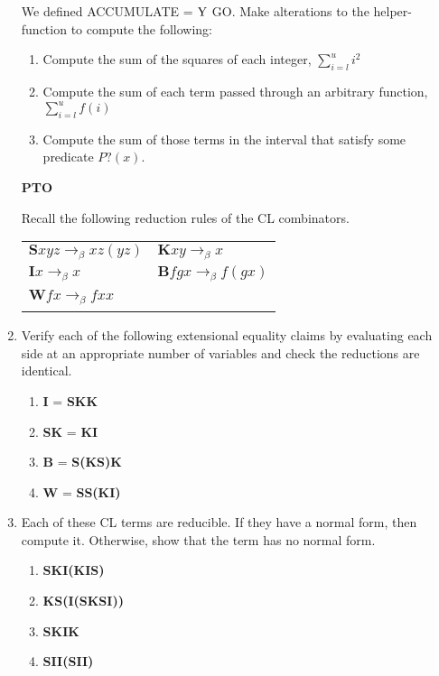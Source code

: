 \documentclass[11pt]{report}
\begin{document}
\begin{enumerate}
	 We defined ACCUMULATE = $\text{Y}$ GO. Make alterations to the helper-function to compute the following: 
	
	 \begin{enumerate}
	 	\item Compute the sum of the squares of each integer, $\sum_{i=l}^u i^{2}$
	 	\item Compute the sum of each term passed through an arbitrary function, $\sum_{i=l}^u f(i)$
	 	\item Compute the sum of those terms in the interval that satisfy some predicate $P?(x)$.
	 \end{enumerate}
	 
	 \vfill
	 \hfill \textbf{PTO}



\newpage

Recall the following reduction rules of the CL combinators. 

\begin{tabular}{l l}
$\textbf{S}xyz \to_{\beta} xz(yz)$ & $\textbf{K}xy \to_{\beta} x$ \\
$\textbf{I}x \to_{\beta} x$ & $\textbf{B}fgx \to_{\beta}f(gx)$ \\
$\textbf{W}fx \to_{\beta}fxx$ & \
\end{tabular}

\item Verify each of the following extensional equality claims by evaluating each side at an appropriate number of variables and check the reductions are identical.

	\begin{enumerate}
		\item \textbf{I} = \textbf{SKK}
		\item \textbf{SK} = \textbf{KI}
		\item \textbf{B} = \textbf{S(KS)K}
		\item \textbf{W} = \textbf{SS(KI)}
	\end{enumerate}

\item Each of these CL terms are reducible. If they have a normal form, then compute it. Otherwise, show that the term has no normal form.

	\begin{enumerate}
		\item \textbf{SKI(KIS)}
		\item \textbf{KS(I(SKSI))}
		\item \textbf{SKIK}	
		\item \textbf{SII(SII)}
	\end{enumerate}


\end{enumerate}
\end{document}
